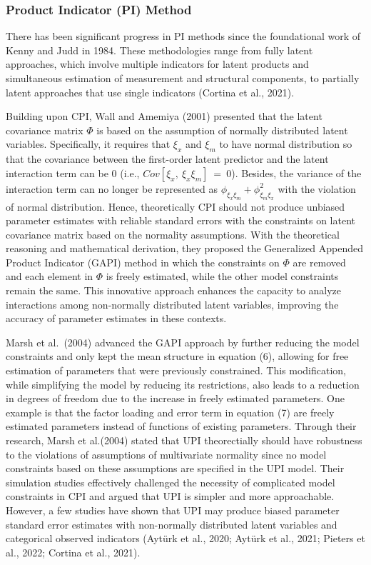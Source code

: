 \documentclass[
  man]{apa7}
\begin{document}
\hypertarget{product-indicator-pi-method}{%
\subsubsection{Product Indicator (PI) Method}\label{product-indicator-pi-method}}

There has been significant progress in PI methods since the foundational work of Kenny and Judd in 1984. These methodologies range from fully latent approaches, which involve multiple indicators for latent products and simultaneous estimation of measurement and structural components, to partially latent approaches that use single indicators (Cortina et al., 2021).

Building upon CPI, Wall and Amemiya (2001) presented that the latent covariance matrix \({\Phi}\) is based on the assumption of normally distributed latent variables. Specifically, it requires that \(\xi_{x}\) and \(\xi_{m}\) to have normal distribution so that the covariance between the first-order latent predictor and the latent interaction term can be 0 (i.e., \(Cov[\xi_{x}, \ \xi_{x}\xi_{m}] \ = \ 0\)). Besides, the variance of the interaction term can no longer be represented as \(\phi_{\xi_{x}\xi_{m}} + \phi_{\xi_{m}\xi_{x}}^2\) with the violation of normal distribution. Hence, theoretically CPI should not produce unbiased parameter estimates with reliable standard errors with the constraints on latent covariance matrix based on the normality assumptions. With the theoretical reasoning and mathematical derivation, they proposed the Generalized Appended Product Indicator (GAPI) method in which the constraints on \({\Phi}\) are removed and each element in \({\Phi}\) is freely estimated, while the other model constraints remain the same. This innovative approach enhances the capacity to analyze interactions among non-normally distributed latent variables, improving the accuracy of parameter estimates in these contexts.

Marsh et al.~(2004) advanced the GAPI approach by further reducing the model constraints and only kept the mean structure in equation (6), allowing for free estimation of parameters that were previously constrained. This modification, while simplifying the model by reducing its restrictions, also leads to a reduction in degrees of freedom due to the increase in freely estimated parameters. One example is that the factor loading and error term in equation (7) are freely estimated parameters instead of functions of existing parameters. Through their research, Marsh et al.(2004) stated that UPI theorectially should have robustness to the violations of assumptions of multivariate normality since no model constraints based on these assumptions are specified in the UPI model. Their simulation studies effectively challenged the necessity of complicated model constraints in CPI and argued that UPI is simpler and more approachable. However, a few studies have shown that UPI may produce biased parameter standard error estimates with non-normally distributed latent variables and categorical observed indicators (Aytürk et al., 2020; Aytürk et al., 2021; Pieters et al., 2022; Cortina et al., 2021).
\end{document}
